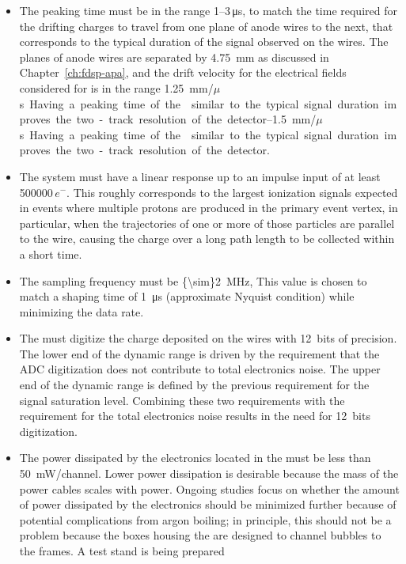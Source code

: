 \begin{itemize}
\item{The  peaking time must be in the range \numrange{1}{3}\,\si{\micro\second},
to match the time required for the drifting charges to travel from one plane of anode
wires to the next, that corresponds to the typical duration of the signal observed
on the wires. The planes of anode wires are separated by \SI{4.75}{mm}
as discussed in Chapter~\ref{ch:fdsp-apa}, and the drift velocity for
the electrical fields considered for  is in the range
\SIrange{1.25}{1.5}{mm/$\mu$s}. Having a peaking time of the 
similar to the typical signal duration improves the two-track resolution of
the detector.}
\item{The system must have a linear response up to an impulse input of 
at least \num{500000}\,$e^{-}$.  This roughly corresponds to the largest 
ionization signals expected in events where multiple protons are produced 
in the primary event vertex, in particular, when the trajectories of one 
or more of those particles are parallel to the wire, causing the charge 
over a long path length to be collected within a short time.}
\item{The  sampling frequency must be \SI{{\sim}2}{MHz},
This value is chosen to match a  shaping time of \SI{1}{\micro\second} 
(approximate Nyquist condition) while minimizing the data rate.}
\item{The  must digitize the charge deposited on the wires 
with 12~bits of precision.  The lower end of the  dynamic 
range is driven by the requirement that the ADC digitization does not 
contribute to total electronics noise. The upper end of the  
dynamic range is defined by the previous requirement for the signal 
saturation level. Combining these two requirements with the requirement 
for the total electronics noise results in the need for 12~bits digitization.}
\item{The power dissipated by the electronics located in the  must
be less than \SI{50}{mW/channel}.  Lower power dissipation is desirable 
because the mass of the power cables scales with  power. Ongoing studies 
focus on whether the amount of power dissipated by the electronics 
should be minimized further because of potential complications from 
argon boiling; in principle, this should not be a problem because the 
 boxes housing the  are designed to channel 
bubbles to the  frames. A test stand is being prepared
}
\end{itemize}
